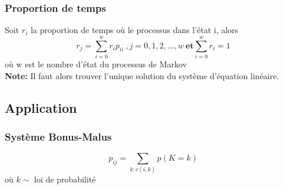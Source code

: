 \documentclass[13pt]{article}
\begin{document}
\subsubsection*{Proportion de temps}
Soit $r_i$ la proportion de temps où le processus dans l'état i, alors 
\[ r_j = \sum_{i=0}^w r_i p_{ii}\:,j=0,1,2,...,w\: \textbf{et} \sum_{i=0}^w r_i = 1 \]
où w est le nombre d'état du processus de Markov \\
\textbf{Note:} Il faut alors trouver l'unique solution du système d'équation linéaire.

\subsection*{Application}

\subsubsection*{Système Bonus-Malus}
\[ p_{ij} = \sum_{k:c(i,k)} p(K = k) \] 
où $k \sim$ loi de probabilité 
\end{document}
